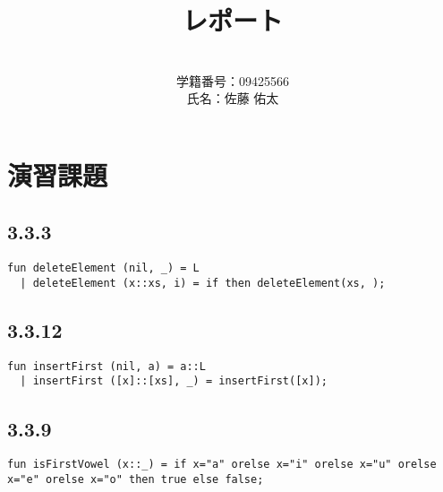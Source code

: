 \documentclass[a4j]{jarticle}
\title{レポート}
\author{\\学籍番号：09425566\\氏名：佐藤 佑太}
\begin{document}
\maketitle

\newpage


\section{演習課題}


\subsection{3.3.3}

\begin{verbatim}
fun deleteElement (nil, _) = L
  | deleteElement (x::xs, i) = if then deleteElement(xs, );
\end{verbatim}

\subsection{3.3.12}

\begin{verbatim}
fun insertFirst (nil, a) = a::L
  | insertFirst ([x]::[xs], _) = insertFirst([x]);
\end{verbatim}

\subsection{3.3.9}

\begin{verbatim}
fun isFirstVowel (x::_) = if x="a" orelse x="i" orelse x="u" orelse x="e" orelse x="o" then true else false;
\end{verbatim}
\end{document}
